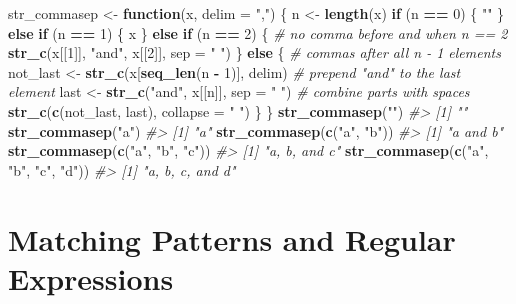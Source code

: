 \documentclass[]{book}
\newenvironment{Shaded}{\begin{snugshade}}{\end{snugshade}}
\newcommand{\CommentTok}[1]{\textcolor[rgb]{0.56,0.35,0.01}{\textit{#1}}}
\newcommand{\ControlFlowTok}[1]{\textcolor[rgb]{0.13,0.29,0.53}{\textbf{#1}}}
\newcommand{\DataTypeTok}[1]{\textcolor[rgb]{0.13,0.29,0.53}{#1}}
\newcommand{\DecValTok}[1]{\textcolor[rgb]{0.00,0.00,0.81}{#1}}
\newcommand{\KeywordTok}[1]{\textcolor[rgb]{0.13,0.29,0.53}{\textbf{#1}}}
\newcommand{\NormalTok}[1]{#1}
\newcommand{\OperatorTok}[1]{\textcolor[rgb]{0.81,0.36,0.00}{\textbf{#1}}}
\newcommand{\StringTok}[1]{\textcolor[rgb]{0.31,0.60,0.02}{#1}}
\theoremstyle{plain}
\theoremstyle{remark}
\begin{document}
\begin{Shaded}
\begin{Highlighting}[]
\NormalTok{str_commasep <-}\StringTok{ }\ControlFlowTok{function}\NormalTok{(x, }\DataTypeTok{delim =} \StringTok{","}\NormalTok{) \{}
\NormalTok{  n <-}\StringTok{ }\KeywordTok{length}\NormalTok{(x)}
  \ControlFlowTok{if}\NormalTok{ (n }\OperatorTok{==}\StringTok{ }\DecValTok{0}\NormalTok{) \{}
    \StringTok{""}
\NormalTok{  \} }\ControlFlowTok{else} \ControlFlowTok{if}\NormalTok{ (n }\OperatorTok{==}\StringTok{ }\DecValTok{1}\NormalTok{) \{}
\NormalTok{    x}
\NormalTok{  \} }\ControlFlowTok{else} \ControlFlowTok{if}\NormalTok{ (n }\OperatorTok{==}\StringTok{ }\DecValTok{2}\NormalTok{) \{}
    \CommentTok{# no comma before and when n == 2}
    \KeywordTok{str_c}\NormalTok{(x[[}\DecValTok{1}\NormalTok{]], }\StringTok{"and"}\NormalTok{, x[[}\DecValTok{2}\NormalTok{]], }\DataTypeTok{sep =} \StringTok{" "}\NormalTok{)}
\NormalTok{  \} }\ControlFlowTok{else}\NormalTok{ \{}
    \CommentTok{# commas after all n - 1 elements}
\NormalTok{    not_last <-}\StringTok{ }\KeywordTok{str_c}\NormalTok{(x[}\KeywordTok{seq_len}\NormalTok{(n }\OperatorTok{-}\StringTok{ }\DecValTok{1}\NormalTok{)], delim)}
    \CommentTok{# prepend "and" to the last element}
\NormalTok{    last <-}\StringTok{ }\KeywordTok{str_c}\NormalTok{(}\StringTok{"and"}\NormalTok{, x[[n]], }\DataTypeTok{sep =} \StringTok{" "}\NormalTok{)}
    \CommentTok{# combine parts with spaces}
    \KeywordTok{str_c}\NormalTok{(}\KeywordTok{c}\NormalTok{(not_last, last), }\DataTypeTok{collapse =} \StringTok{" "}\NormalTok{)}
\NormalTok{  \}}
\NormalTok{\}}
\KeywordTok{str_commasep}\NormalTok{(}\StringTok{""}\NormalTok{)}
\CommentTok{#> [1] ""}
\KeywordTok{str_commasep}\NormalTok{(}\StringTok{"a"}\NormalTok{)}
\CommentTok{#> [1] "a"}
\KeywordTok{str_commasep}\NormalTok{(}\KeywordTok{c}\NormalTok{(}\StringTok{"a"}\NormalTok{, }\StringTok{"b"}\NormalTok{))}
\CommentTok{#> [1] "a and b"}
\KeywordTok{str_commasep}\NormalTok{(}\KeywordTok{c}\NormalTok{(}\StringTok{"a"}\NormalTok{, }\StringTok{"b"}\NormalTok{, }\StringTok{"c"}\NormalTok{))}
\CommentTok{#> [1] "a, b, and c"}
\KeywordTok{str_commasep}\NormalTok{(}\KeywordTok{c}\NormalTok{(}\StringTok{"a"}\NormalTok{, }\StringTok{"b"}\NormalTok{, }\StringTok{"c"}\NormalTok{, }\StringTok{"d"}\NormalTok{))}
\CommentTok{#> [1] "a, b, c, and d"}
\end{Highlighting}
\end{Shaded}

\hypertarget{matching-patterns-and-regular-expressions}{%
\section{Matching Patterns and Regular Expressions}\label{matching-patterns-and-regular-expressions}}
\end{document}
